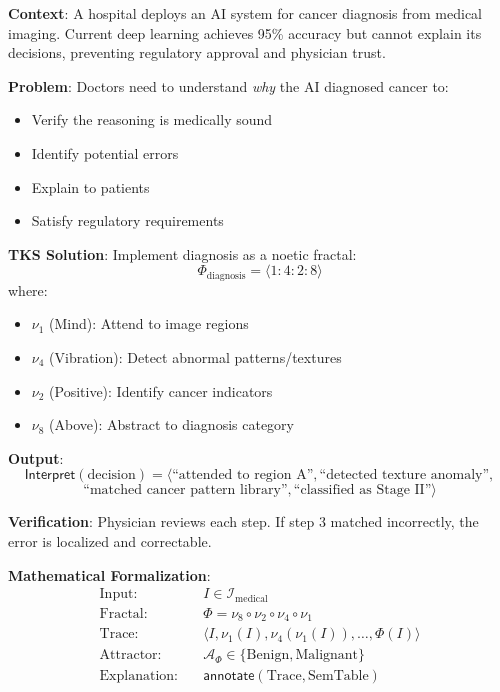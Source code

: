 \documentclass[11pt,twoside]{article}
\theoremstyle{definition}
\theoremstyle{plain}
\theoremstyle{remark}
\newcommand{\Ideas}{\mathcal{I}}
\newcommand{\noe}[1]{\nu_{#1}}
\newcommand{\Frac}{\Phi}
\newcommand{\FractalAttractor}{\mathcal{A}_\Phi}
\newcommand{\Interpret}{\mathsf{Interpret}}
\begin{document}
\begin{tcolorbox}[colback=yellow!10!white,colframe=orange!75!black,title=\textbf{Scenario: Medical Diagnosis AI}]
\textbf{Context}: A hospital deploys an AI system for cancer diagnosis from medical
imaging. Current deep learning achieves 95\% accuracy but cannot explain its decisions,
preventing regulatory approval and physician trust.

\textbf{Problem}: Doctors need to understand \emph{why} the AI diagnosed cancer to:
\begin{itemize}
  \item Verify the reasoning is medically sound
  \item Identify potential errors
  \item Explain to patients
  \item Satisfy regulatory requirements
\end{itemize}

\textbf{TKS Solution}: Implement diagnosis as a noetic fractal:
\[
\Frac_{\mathrm{diagnosis}} = \langle 1 : 4 : 2 : 8 \rangle
\]
where:
\begin{itemize}
  \item $\noe{1}$ (Mind): Attend to image regions
  \item $\noe{4}$ (Vibration): Detect abnormal patterns/textures
  \item $\noe{2}$ (Positive): Identify cancer indicators
  \item $\noe{8}$ (Above): Abstract to diagnosis category
\end{itemize}

\textbf{Output}:
\[
\Interpret(\text{decision}) = \langle \text{``attended to region A''}, \text{``detected texture anomaly''},
\]
\[
\text{``matched cancer pattern library''}, \text{``classified as Stage II''} \rangle
\]

\textbf{Verification}: Physician reviews each step. If step 3 matched incorrectly,
the error is localized and correctable.
\end{tcolorbox}

\textbf{Mathematical Formalization}:
\begin{equation}
\boxed{
\begin{aligned}
\text{Input}: & \quad I \in \Ideas_{\mathrm{medical}} \\
\text{Fractal}: & \quad \Frac = \noe{8} \circ \noe{2} \circ \noe{4} \circ \noe{1} \\
\text{Trace}: & \quad \langle I, \noe{1}(I), \noe{4}(\noe{1}(I)), \ldots, \Frac(I) \rangle \\
\text{Attractor}: & \quad \FractalAttractor \in \{\text{Benign}, \text{Malignant}\} \\
\text{Explanation}: & \quad \mathsf{annotate}(\text{Trace}, \text{SemTable})
\end{aligned}
}
\end{equation}
\end{document}
